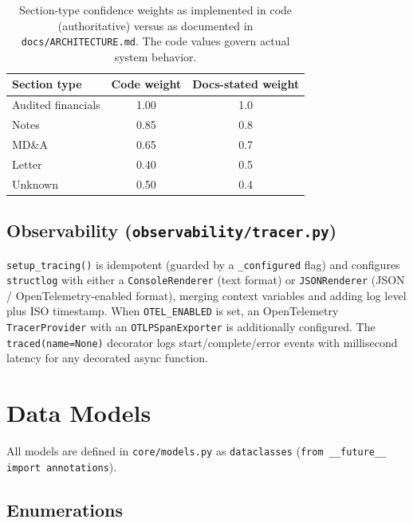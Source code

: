 \documentclass[11pt,a4paper]{report}
\newcommand{\code}[1]{\texttt{#1}}
\newcommand{\file}[1]{\texttt{\small #1}}
\begin{document}
\begin{table}[h]
\centering
\caption{Section-type confidence weights as implemented in code (authoritative)
versus as documented in \file{docs/ARCHITECTURE.md}. The code values govern actual
system behavior.}
\label{tab:section-weights}
\begin{tabular}{@{}lcc@{}}
\toprule
\textbf{Section type} & \textbf{Code weight} & \textbf{Docs-stated weight} \\
\midrule
Audited financials & 1.00 & 1.0 \\
Notes & 0.85 & 0.8 \\
MD\&A & 0.65 & 0.7 \\
Letter & 0.40 & 0.5 \\
Unknown & 0.50 & 0.4 \\
\bottomrule
\end{tabular}
\end{table}

\section{Observability (\file{observability/tracer.py})}

\code{setup\_tracing()} is idempotent (guarded by a \code{\_configured} flag) and
configures \code{structlog} with either a \code{ConsoleRenderer} (text format) or
\code{JSONRenderer} (JSON / OpenTelemetry-enabled format), merging context variables and
adding log level plus ISO timestamp. When \code{OTEL\_ENABLED} is set, an OpenTelemetry
\code{TracerProvider} with an \code{OTLPSpanExporter} is additionally configured. The
\code{traced(name=None)} decorator logs start/complete/error events with millisecond
latency for any decorated async function.

\chapter{Data Models}
\label{ch:models}

All models are defined in \file{core/models.py} as \code{dataclasses}
(\code{from \_\_future\_\_ import annotations}).

\section{Enumerations}
\end{document}
